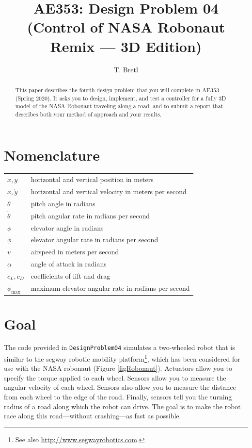 \documentclass[conf]{new-aiaa}
\title{AE353: Design Problem 04\\ (Control of NASA Robonaut Remix --- 3D Edition)}
\author{T. Bretl}
\begin{document}
\maketitle


\begin{abstract}
This paper describes the fourth design problem that you will complete in AE353 (Spring 2020). It asks you to design, implement, and test a controller for a fully 3D model of the NASA Robonaut traveling along a road, and to submit a report that describes both your method of approach and your results.
\end{abstract}

\section{Nomenclature}

{\renewcommand\arraystretch{1.0}
\noindent\begin{longtable*}{@{}l @{\quad=\quad} l@{}}
$x, y$ & horizontal and vertical position in meters \\
$\dot{x}, \dot{y}$ & horizontal and vertical velocity in meters per second\\
$\theta$ & pitch angle in radians \\
$\dot{\theta}$ & pitch angular rate in radians per second \\
$\phi$ & elevator angle in radians \\
$\dot{\phi}$ & elevator angular rate in radians per second \\
$v$ & airspeed in meters per second \\
$\alpha$ & angle of attack in radians \\
$c_{L}, c_{D}$ & coefficients of lift and drag \\
$\dot{\phi}_{\text{max}}$ & maximum elevator angular rate in radians per second
\end{longtable*}}



\section{Goal}

The code provided in \lstinline!DesignProblem04! simulates a two-wheeled robot that is similar to the segway robotic mobility platform\footnote{See also \url{http://www.segwayrobotics.com}.}, which has been considered for use with the NASA robonaut (Figure \ref{figRobonaut}). Actuators allow you to specify the torque applied to each wheel. Sensors allow you to measure the angular velocity of each wheel. Sensors also allow you to measure the distance from each wheel to the edge of the road. Finally, sensors tell you the turning radius of a road along which the robot can drive. The goal is to make the robot race along this road---without crashing---as fast as possible.
\end{document}
